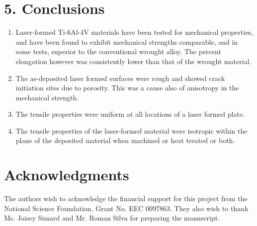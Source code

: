 \documentclass[10pt]{article}
\begin{document}
\section*{5. Conclusions}
\begin{enumerate}
  \item Laser-formed Ti-6Al-4V materials have been tested for mechanical properties, and have been found to exhibit mechanical strengths comparable, and in some tests, superior to the conventional wrought alloy. The percent elongation however was consistently lower than that of the wrought material.

  \item The as-deposited laser formed surfaces were rough and showed crack initiation sites due to porosity. This was a cause also of anisotropy in the mechanical strength.

  \item The tensile properties were uniform at all locations of a laser formed plate.

  \item The tensile properties of the laser-formed material were isotropic within the plane of the deposited material when machined or heat treated or both.

\end{enumerate}

\section*{Acknowledgments}
The authors wish to acknowledge the financial support for this project from the National Science Foundation, Grant No. EEC 0097863. They also wish to thank Ms. Jaisey Simard and Mr. Roman Silva for preparing the manuscript.
\end{document}
